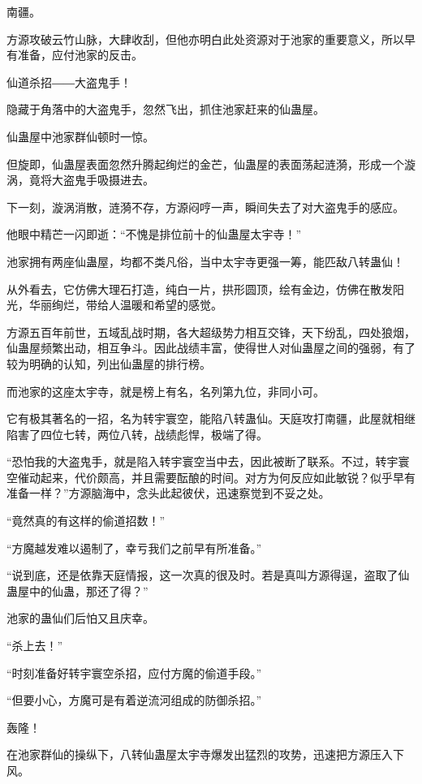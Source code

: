 
\begin{this_body}

南疆。

方源攻破云竹山脉，大肆收刮，但他亦明白此处资源对于池家的重要意义，所以早有准备，应付池家的反击。

仙道杀招――大盗鬼手！

隐藏于角落中的大盗鬼手，忽然飞出，抓住池家赶来的仙蛊屋。

仙蛊屋中池家群仙顿时一惊。

但旋即，仙蛊屋表面忽然升腾起绚烂的金芒，仙蛊屋的表面荡起涟漪，形成一个漩涡，竟将大盗鬼手吸摄进去。

下一刻，漩涡消散，涟漪不存，方源闷哼一声，瞬间失去了对大盗鬼手的感应。

他眼中精芒一闪即逝：“不愧是排位前十的仙蛊屋太宇寺！”

池家拥有两座仙蛊屋，均都不类凡俗，当中太宇寺更强一筹，能匹敌八转蛊仙！

从外看去，它仿佛大理石打造，纯白一片，拱形圆顶，绘有金边，仿佛在散发阳光，华丽绚烂，带给人温暖和希望的感觉。

方源五百年前世，五域乱战时期，各大超级势力相互交锋，天下纷乱，四处狼烟，仙蛊屋频繁出动，相互争斗。因此战绩丰富，使得世人对仙蛊屋之间的强弱，有了较为明确的认知，列出仙蛊屋的排行榜。

而池家的这座太宇寺，就是榜上有名，名列第九位，非同小可。

它有极其著名的一招，名为转宇寰空，能陷八转蛊仙。天庭攻打南疆，此屋就相继陷害了四位七转，两位八转，战绩彪悍，极端了得。

“恐怕我的大盗鬼手，就是陷入转宇寰空当中去，因此被断了联系。不过，转宇寰空催动起来，代价颇高，并且需要酝酿的时间。对方为何反应如此敏锐？似乎早有准备一样？”方源脑海中，念头此起彼伏，迅速察觉到不妥之处。

“竟然真的有这样的偷道招数！”

“方魔越发难以遏制了，幸亏我们之前早有所准备。”

“说到底，还是依靠天庭情报，这一次真的很及时。若是真叫方源得逞，盗取了仙蛊屋中的仙蛊，那还了得？”

池家的蛊仙们后怕又且庆幸。

“杀上去！”

“时刻准备好转宇寰空杀招，应付方魔的偷道手段。”

“但要小心，方魔可是有着逆流河组成的防御杀招。”

轰隆！

在池家群仙的操纵下，八转仙蛊屋太宇寺爆发出猛烈的攻势，迅速把方源压入下风。


\end{this_body}
